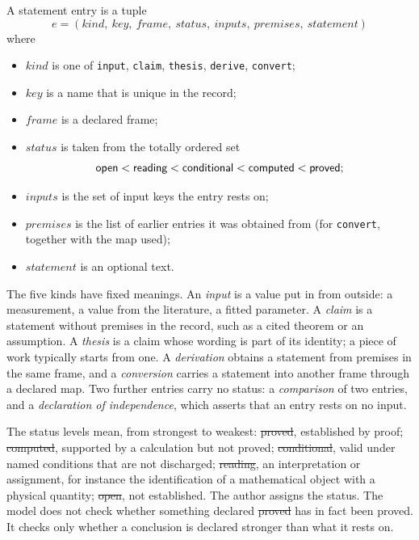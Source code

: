 \begin{definition}[Entry]\label{def:entry}
A statement entry is a tuple
\[
e=(\mathit{kind},\ \mathit{key},\ \mathit{frame},\ \mathit{status},\ \mathit{inputs},\ \mathit{premises},\ \mathit{statement})
\]
where
\begin{itemize}[nosep,leftmargin=1.5em]
\item $\mathit{kind}$ is one of \texttt{input}, \texttt{claim}, \texttt{thesis}, \texttt{derive}, \texttt{convert};
\item $\mathit{key}$ is a name that is unique in the record;
\item $\mathit{frame}$ is a declared frame;
\item $\mathit{status}$ is taken from the totally ordered set
\[
\textsf{open}<\textsf{reading}<\textsf{conditional}<\textsf{computed}<\textsf{proved};
\]
\item $\mathit{inputs}$ is the set of input keys the entry rests on;
\item $\mathit{premises}$ is the list of earlier entries it was obtained from (for \texttt{convert}, together with the map used);
\item $\mathit{statement}$ is an optional text.
\end{itemize}
\end{definition}

The five kinds have fixed meanings. An \emph{input} is a value put in from outside: a measurement, a value from the literature, a
fitted parameter. A \emph{claim} is a statement without premises in the record, such as a cited theorem or an assumption. A
\emph{thesis} is a claim whose wording is part of its identity; a piece of work typically starts from one. A \emph{derivation} obtains
a statement from premises in the same frame, and a \emph{conversion} carries a statement into another frame through a declared map.
Two further entries carry no status: a \emph{comparison} of two entries, and a \emph{declaration of independence}, which asserts
that an entry rests on no input.

The status levels mean, from strongest to weakest: \st{proved}, established by proof; \st{computed}, supported by a calculation but
not proved; \st{conditional}, valid under named conditions that are not discharged; \st{reading}, an interpretation or assignment,
for instance the identification of a mathematical object with a physical quantity; \st{open}, not established. The author assigns
the status. The model does not check whether something declared \st{proved} has in fact been proved. It checks only whether a
conclusion is declared stronger than what it rests on.

